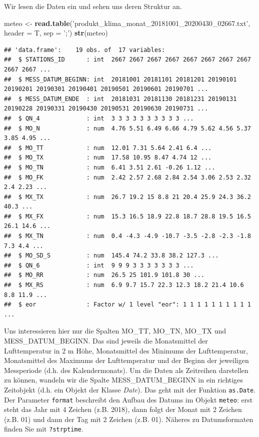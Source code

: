\documentclass[]{book}
\newenvironment{Shaded}{\begin{snugshade}}{\end{snugshade}}
\newcommand{\DataTypeTok}[1]{\textcolor[rgb]{0.13,0.29,0.53}{#1}}
\newcommand{\KeywordTok}[1]{\textcolor[rgb]{0.13,0.29,0.53}{\textbf{#1}}}
\newcommand{\NormalTok}[1]{#1}
\newcommand{\StringTok}[1]{\textcolor[rgb]{0.31,0.60,0.02}{#1}}
\begin{document}
Wir lesen die Daten ein und sehen uns deren Struktur an.

\begin{Shaded}
\begin{Highlighting}[]
\NormalTok{meteo <-}\StringTok{ }\KeywordTok{read.table}\NormalTok{(}\StringTok{'produkt_klima_monat_20181001_20200430_02667.txt'}\NormalTok{,}
\DataTypeTok{header =}\NormalTok{ T, }\DataTypeTok{sep =} \StringTok{';'}\NormalTok{)}
\KeywordTok{str}\NormalTok{(meteo)}
\end{Highlighting}
\end{Shaded}

\begin{verbatim}
## 'data.frame':    19 obs. of  17 variables:
##  $ STATIONS_ID      : int  2667 2667 2667 2667 2667 2667 2667 2667 2667 2667 ...
##  $ MESS_DATUM_BEGINN: int  20181001 20181101 20181201 20190101 20190201 20190301 20190401 20190501 20190601 20190701 ...
##  $ MESS_DATUM_ENDE  : int  20181031 20181130 20181231 20190131 20190228 20190331 20190430 20190531 20190630 20190731 ...
##  $ QN_4             : int  3 3 3 3 3 3 3 3 3 3 ...
##  $ MO_N             : num  4.76 5.51 6.49 6.66 4.79 5.62 4.56 5.37 3.85 4.95 ...
##  $ MO_TT            : num  12.01 7.31 5.64 2.41 6.4 ...
##  $ MO_TX            : num  17.58 10.95 8.47 4.74 12 ...
##  $ MO_TN            : num  6.41 3.51 2.61 -0.26 1.12 ...
##  $ MO_FK            : num  2.42 2.57 2.68 2.84 2.54 3.06 2.53 2.32 2.4 2.23 ...
##  $ MX_TX            : num  26.7 19.2 15 8.8 21 20.4 25.9 24.3 36.2 40.3 ...
##  $ MX_FX            : num  15.3 16.5 18.9 22.8 18.7 28.8 19.5 16.5 26.1 14.6 ...
##  $ MX_TN            : num  0.4 -4.3 -4.9 -10.7 -3.5 -2.8 -2.3 -1.8 7.3 4.4 ...
##  $ MO_SD_S          : num  145.4 74.2 33.8 38.2 127.3 ...
##  $ QN_6             : int  9 9 9 3 3 3 3 3 3 3 ...
##  $ MO_RR            : num  26.5 25 101.9 101.8 30 ...
##  $ MX_RS            : num  6.9 9.7 15.7 22.3 12.3 18.2 21.4 10.6 8.8 11.9 ...
##  $ eor              : Factor w/ 1 level "eor": 1 1 1 1 1 1 1 1 1 1 ...
\end{verbatim}

Uns interessieren hier nur die Spalten MO\_TT, MO\_TN, MO\_TX und MESS\_DATUM\_BEGINN. Das sind jeweils die Monatsmittel der Lufttemperatur in 2 m Höhe, Monatsmittel des Minimums der Lufttemperatur, Monatsmittel des Maximums der Lufttemperatur und der Beginn der jeweiligen Messperiode (d.h. des Kalendermonats). Um die Daten als Zeitreihen darstellen zu können, wandeln wir die Spalte MESS\_DATUM\_BEGINN in ein richtiges Zeitobjekt (d.h. ein Objekt der Klasse \emph{Date}). Das geht mit der Funktion \texttt{as.Date}. Der Parameter \texttt{format} beschreibt den Aufbau des Datums im Objekt \texttt{meteo}: erst steht das Jahr mit 4 Zeichen (z.B. 2018), dann folgt der Monat mit 2 Zeichen (z.B. 01) und dann der Tag mit 2 Zeichen (z.B. 01). Näheres zu Datumsformaten finden Sie mit \texttt{?strptime}.
\end{document}
